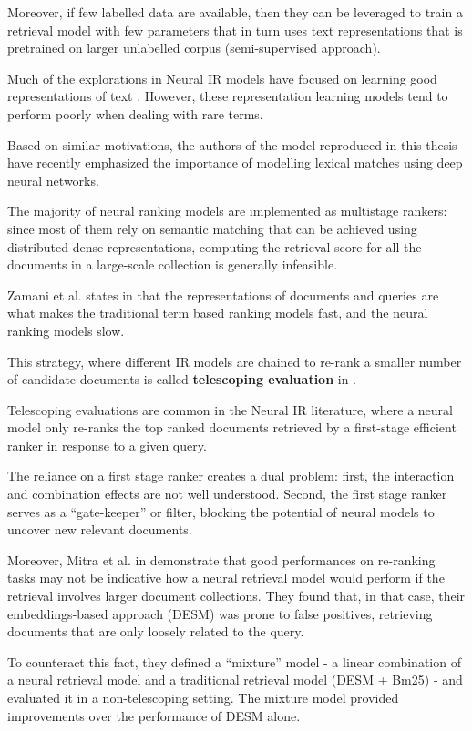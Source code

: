 Moreover, if few labelled data are available, then they can be leveraged to train a retrieval model with few parameters that in turn uses text representations that is pretrained on larger unlabelled corpus (semi-supervised approach).

Much of the explorations in Neural IR models have focused on learning good representations of text \cite{nn4ir}. However, these representation learning models tend to perform poorly when dealing with rare terms.

Based on similar motivations, the authors of the model reproduced in this thesis have recently emphasized the importance of modelling lexical matches using deep neural networks.

The majority of neural ranking models are implemented as multistage rankers: since most of them rely on semantic matching that can be achieved using distributed dense representations, computing the retrieval score for all the documents in a large-scale collection is generally infeasible.

Zamani et al. states in \cite{stdlnneur} that the representations of documents and queries are what makes the traditional term based ranking models fast, and the neural ranking models slow.

This strategy, where different IR models are chained to re-rank a smaller number of candidate documents is called \textbf{telescoping evaluation} in \cite{nn4ir}.

Telescoping evaluations are common in the Neural IR literature, where a neural model only re-ranks the top ranked documents retrieved by a first-stage efficient ranker in response to a given query.

The reliance on a first stage ranker creates a dual problem: first, the interaction and combination effects are not well understood. Second, the first stage ranker serves as a ``gate-keeper'' or filter, blocking the potential of neural models to uncover new relevant documents.

Moreover, Mitra et al. in \cite{Mitra2016ADE} demonstrate that good performances on re-ranking tasks may not be indicative how a neural retrieval model would perform if the retrieval involves larger document collections. They found that, in that case, their embeddings-based approach (DESM) was prone to false positives, retrieving documents that are only loosely related to the query.

To counteract this fact, they defined a ``mixture'' model - a linear combination of a neural retrieval model and a traditional retrieval model (DESM + Bm25) - and evaluated it in a non-telescoping setting. The mixture model provided improvements over the performance of DESM alone.

